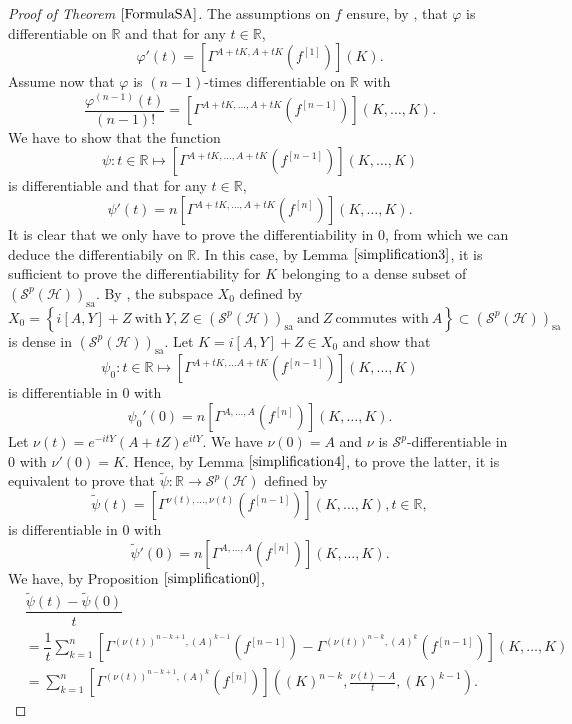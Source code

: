 \documentclass[12pt]{amsart}
\theoremstyle{remark}
\begin{document}
\begin{proof}[Proof of Theorem $\ref{FormulaSA}$]
The assumptions on $f$ ensure, by \cite[Theorem 7.13]{KPSS}, that $\varphi$ is differentiable on $\mathbb{R}$ and that for any $t\in \mathbb{R}$,
$$
\varphi'(t) = \left[\Gamma^{A+tK, A+tK}(f^{[1]}) \right](K).
$$
Assume now that $\varphi$ is $(n-1)$-times differentiable on $\mathbb{R}$ with
$$
\dfrac{\varphi^{(n-1)}(t)}{(n-1)!} = \left[\Gamma^{A+tK, \ldots, A+tK}(f^{[n-1]}) \right](K, \ldots, K).
$$
We have to show that the function
$$
\psi : t\in \mathbb{R} \mapsto \left[\Gamma^{A+tK, \ldots, A+tK}(f^{[n-1]}) \right](K, \ldots, K)
$$
is differentiable and that for any $t\in \mathbb{R}$,
$$
\psi'(t) = n \left[\Gamma^{A+tK, \ldots, A+tK}(f^{[n]}) \right](K, \ldots, K).
$$
It is clear that we only have to prove the differentiability in $0$, from which we can deduce the differentiabily on $\mathbb{R}$. In this case, by Lemma $\ref{simplification3}$, it is sufficient to prove the differentiability for $K$ belonging to a dense subset of $(\mathcal{S}^p(\mathcal{H}))_{\text{sa}}$. By \cite[Proposition 6.2]{KPSS}, the subspace $X_0$ defined by
$$
X_0 = \left\lbrace i[A,Y] + Z \ \text{with} \ Y,Z \in (\mathcal{S}^p(\mathcal{H}))_{\text{sa}} \ \text{and} \ Z \ \text{commutes with} \ A \right\rbrace \subset (\mathcal{S}^p(\mathcal{H}))_{\text{sa}}
$$
is dense in $(\mathcal{S}^p(\mathcal{H}))_{\text{sa}}$. Let $K = i[A,Y] + Z \in X_0$ and show that
$$
\psi_0 : t\in \mathbb{R} \mapsto \left[\Gamma^{A+tK, \ldots A+tK}(f^{[n-1]}) \right](K, \ldots, K)
$$
is differentiable in $0$ with
$$
\psi_0'(0) = n \left[\Gamma^{A, \ldots, A}(f^{[n]}) \right](K, \ldots, K).
$$
Let $\nu(t) = e^{-itY}(A+tZ)e^{itY}$. We have $\nu(0)=A$ and $\nu$ is $\mathcal{S}^p$-differentiable in $0$ with $\nu'(0)=K$. Hence, by Lemma $\ref{simplification4}$, to prove the latter, it is equivalent to prove that $\tilde{\psi} : \mathbb{R} \to \mathcal{S}^p(\mathcal{H})$ defined by
$$
\tilde{\psi}(t) = \left[ \Gamma^{\nu(t),\ldots,\nu(t)}(f^{[n-1]}) \right](K, \ldots, K), t\in \mathbb{R},
$$
is differentiable in $0$ with
$$
\tilde{\psi}'(0) = n \left[\Gamma^{A, \ldots, A}(f^{[n]}) \right](K, \ldots, K).
$$
We have, by Proposition $\ref{simplification0}$,
\begin{align*}
& \dfrac{\tilde{\psi}(t) - \tilde{\psi}(0)}{t}  \\
& = \dfrac{1}{t} \sum_{k=1}^n \left[ \Gamma^{(\nu(t))^{n-k+1}, (A)^{k-1}}(f^{[n-1]})-\Gamma^{(\nu(t))^{n-k}, (A)^k}(f^{[n-1]}) \right](K, \ldots, K) \\
& = \sum_{k=1}^{n} \left[ \Gamma^{(\nu(t))^{n-k+1}, (A)^k}(f^{[n]})\right]\left( (K)^{n-k}, \frac{\nu(t) - A}{t} , (K)^{k-1} \right).

\end{align*}
\end{proof}
\end{document}
